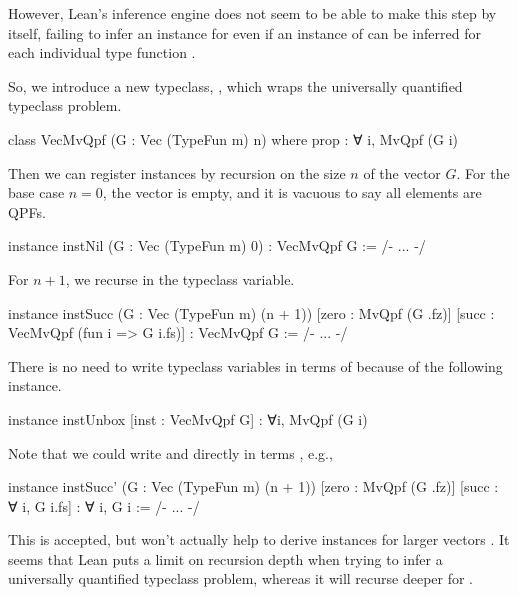 However, Lean's inference engine does not seem to be able to make this step by itself, failing to infer an instance for
 even if an instance of  can be inferred for each individual type function .

So, we introduce a new typeclass, , which wraps the universally quantified typeclass problem.
\begin{leancode}
    class VecMvQpf (G : Vec (TypeFun m) n) where
        prop : ∀ i, MvQpf (G i)
\end{leancode}

Then we can register instances by recursion on the size $n$ of the vector $G$.
For the base case $n=0$, the vector  is empty, and it is vacuous to say all elements are QPFs.

\begin{leancode}
    instance instNil    (G : Vec (TypeFun m) 0) : VecMvQpf G
        := /- ... -/
\end{leancode}

For $n+1$, we recurse in the  typeclass variable.

\begin{leancode}
    instance instSucc   (G : Vec (TypeFun m) (n + 1)) 
                        [zero : MvQpf (G .fz)]
                        [succ : VecMvQpf (fun i => G i.fs)] : 
                            VecMvQpf G 
        := /- ... -/
\end{leancode}

There is no need to write typeclass variables in terms of  because of the following instance.
\begin{leancode}
    instance instUnbox [inst : VecMvQpf G] : 
        ∀i, MvQpf (G i)
\end{leancode}

Note that we could write  and  directly in terms , e.g.,
\begin{leancode}
    instance instSucc'  (G : Vec (TypeFun m) (n + 1)) 
                        [zero : MvQpf (G .fz)]
                        [succ : ∀ i, G i.fs] : 
                            ∀ i, G i 
        := /- ... -/
\end{leancode}
This is accepted, but won't actually help to derive instances for larger vectors .
It seems that Lean puts a limit on recursion depth when trying to infer a universally quantified 
typeclass problem, whereas it will recurse deeper for .






